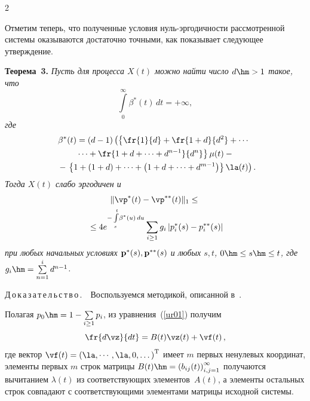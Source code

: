\begin{multicols}{2}
\smallskip

Отметим теперь, что полученные условия нуль-эр\-го\-дич\-ности рас\-смот\-рен\-ной сис\-те\-мы 
оказываются достаточно точными, как показывает следующее утверждение.


\medskip

\noindent
\textbf{Теорема~3.}
\textit{Пусть для процесса $X\left( t\right) $ можно найти число  $d\hm > 1$ такое, что
\begin{equation}
 \int\limits_{0}^{\infty} \beta^*(t) \, dt = + \infty,
\label{3011}
\end{equation}
где}
\begin{multline*}
\beta^*(t) =  \left( d-1\right)\left(\left\{\fr{1}{d} + \fr{1+d}{d^2} + 
\cdots{}\right.\right.\\
\left.{}\cdots +\fr{1+d+\dots+d^{n-1}}{d^n}\right\}\mu(t) -{} \\ 
{} - \left. \left\{1 + \left(1+d\right)+\dots+\left(1+d+\dots+d^{m-1}\right)\right\}\la(t) 
\vphantom{\fr{1}{d^2}}\right).\hspace*{-4.43994pt}
\end{multline*}
\textit{Тогда  $X\left( t\right) $ слабо эргодичен и}
\begin{multline}
\|\vp^*(t)-\vp^{**}(t)\|_{1} \le{}\\
{}\le 4 e^{-\int\limits_s^t \!{\beta^*(u)\,du}}
\sum\limits_{i \ge 1} g_i\left|p_i^*(s)-p_i^{**}(s)\right|\hspace*{-0.34201pt}
 \label{3012'}
\end{multline}
\textit{при любых начальных условиях ${\bf p^*}(s), {\bf p^{**}}(s)$ и любых $s,t$, 
$0\hm\le s\hm\le t$, где $g_i\hm=\sum\limits_{n=1}^{i}d^{n-1}$.}


\smallskip

\noindent
Д\,о\,к\,а\,з\,а\,т\,е\,л\,ь\,с\,т\,в\,о\,.\ \
Воспользуемся методикой, описанной в~\cite{z11,z12}.

Полагая $p_0\hm=1-\sum\limits_{i \ge 1}{p_i}$,  из уравнения~(\ref{ur01}) получим
\begin{equation}
\fr{d\vz}{dt}= B(t)\vz(t)+\vf(t)\,, 
\label{3021}
\end{equation}
где вектор $\vf(t)=\left(\la, \cdots, \la, 0,\dots \right)^{\mathrm{T}}$ имеет $m$ 
первых ненулевых координат, элементы первых $m$ строк матрицы 
$B(t)\hm=\left(b_{ij}(t)\right)_{i,j=1}^{\infty}$ получаются вычитанием $\lambda(t)$ из 
соответствующих элементов~$A(t)$, а элементы остальных строк совпадают с со\-от\-вет\-ст\-ву\-ющи\-ми 
элементами матрицы исходной сис\-темы.
{

}
\end{multicols}
